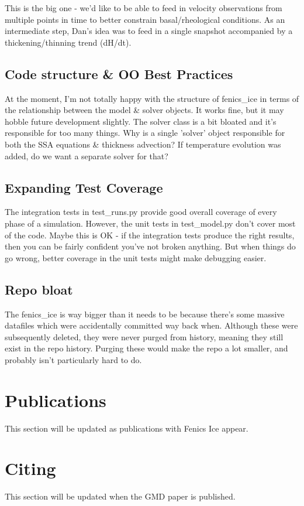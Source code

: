 \documentclass[11pt, reqno, nocenter]{article}
\begin{document}
This is the big one - we'd like to be able to feed in velocity observations from multiple points in time to better constrain basal/rheological conditions. As an intermediate step, Dan's idea was to feed in a single snapshot accompanied by a thickening/thinning trend (dH/dt).

\subsection{Code structure \& OO Best Practices}

At the moment, I'm not totally happy with the structure of fenics\_ice in terms of the relationship between the model \& solver objects. It works fine, but it may hobble future development slightly. The solver class is a bit bloated and it's responsible for too many things. Why is a single 'solver' object responsible for both the SSA equations \& thickness advection? If temperature evolution was added, do we want a separate solver for that?

\subsection{Expanding Test Coverage}

The integration tests in test\_runs.py provide good overall coverage of every phase of a simulation. However, the unit tests in test\_model.py don't cover most of the code. Maybe this is OK - if the integration tests produce the right results, then you can be fairly confident you've not broken anything. But when things do go wrong, better coverage in the unit tests might make debugging easier.

\subsection{Repo bloat}

The fenics\_ice is way bigger than it needs to be because there's some massive datafiles which were accidentally committed way back when. Although these were subsequently deleted, they were never purged from history, meaning they still exist in the repo history. Purging these would make the repo a lot smaller, and probably isn't particularly hard to do.

\section{Publications}
This section will be updated as publications with Fenics Ice appear.

\section{Citing}
This section will be updated when the GMD paper is published.



\newpage


\end{document}
